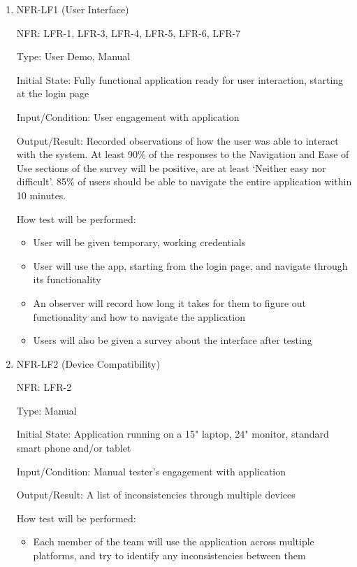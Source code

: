 \documentclass[12pt, titlepage]{article}
\begin{document}
\begin{enumerate}

\item{NFR-LF1 (User Interface)\\}

NFR: LFR-1, LFR-3, LFR-4, LFR-5, LFR-6, LFR-7

Type: User Demo, Manual

Initial State: Fully functional application ready for user interaction, starting
at the login page

Input/Condition: User engagement with application 

Output/Result: Recorded observations of how the user was able to interact with
the system. At least 90\% of the responses to the Navigation and Ease of Use
sections of the survey will be positive, are at least `Neither easy nor
difficult'. 85\% of users should be able to navigate the entire application
within 10 minutes.

How test will be performed: 
\begin{itemize}
  \item User will be given temporary, working credentials 
  \item User will use the app, starting from the login page, and navigate
  through its functionality
  \item An observer will record how long it takes for them to figure out
  functionality and how to navigate the application
  \item Users will also be given a survey about the interface after testing

\end{itemize}
					
\item{NFR-LF2 (Device Compatibility)\\}

NFR: LFR-2

Type: Manual

Initial State: Application running on a 15" laptop, 24" monitor, standard smart
phone and/or tablet

Input/Condition: Manual tester's engagement with application

Output/Result: A list of inconsistencies through multiple devices

How test will be performed: 
\begin{itemize}
  \item Each member of the team will use the application across multiple
  platforms, and try to identify any inconsistencies between them
\end{itemize}
\end{enumerate}
\end{document}

